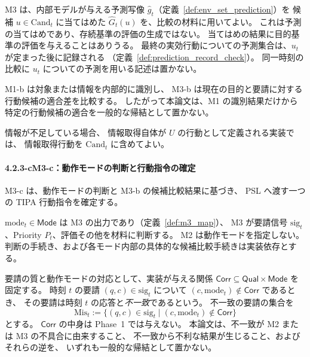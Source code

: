 \begin{remark}[候補ごとの予測の利用]
\label{rem:candidate_prediction}
M3 は、内部モデルが与える予測写像 $\hat g_t$（定義~\ref{def:env_set_prediction}）を
候補 $u\in\mathrm{Cand}_t$ に当てはめた $\hat G_t(u)$ を、比較の材料に用いてよい。
これは予測の当てはめであり、存続基準の評価の生成ではない。
当てはめの結果に目的基準の評価を与えることはありうる。
最終の実効行動についての予測集合は、$u_t$ が定まった後に記録される
（定義~\ref{def:prediction_record_check}）。
同一時刻の比較に $u_t$ についての予測を用いる記述は置かない。
\end{remark}


\begin{remark}[要請適合性と識別の区別]
\label{rem:fit_vs_identity}
M1-b は対象または情報を内部的に識別し、
M3-b は現在の目的と要請に対する行動候補の適合差を比較する。
したがって本論文は、M1 の識別結果だけから特定の行動候補の適合を一般的な帰結として置かない。
\end{remark}

情報が不足している場合、
情報取得自体が $U$ の行動として定義される実装では、
情報取得行動を $\mathrm{Cand}_t$ に含めてよい。

\paragraph*{4.2.3-c\quad M3-c：動作モードの判断と行動指令の確定}

M3-c は、動作モードの判断と M3-b の候補比較結果に基づき、
PSL へ渡す一つの TIPA 行動指令を確定する。

\begin{definition}
\label{def:mode_judgment}
$\mathrm{mode}_t\in\mathsf{Mode}$ は M3 の出力であり（定義~\ref{def:m3_map}）、
M3 が要請信号 $\mathrm{sig}_t$、Priority $P_t$、評価その他を材料に判断する。
M2 は動作モードを指定しない。
判断の手続き、および各モード内部の具体的な候補比較手続きは実装依存とする。
\end{definition}

\begin{definition}
\label{def:request_response_mismatch}
要請の質と動作モードの対応として、実装が与える関係
$\mathsf{Corr}\subseteq\mathsf{Qual}\times\mathsf{Mode}$ を固定する。
時刻 $t$ の要請 $(q,c)\in \mathrm{sig}_t$ について $(c,\mathrm{mode}_t)\notin\mathsf{Corr}$ であるとき、
その要請は時刻 $t$ の応答と\emph{不一致}であるという。
不一致の要請の集合を
\[
  \mathrm{Mis}_t:=\{(q,c)\in \mathrm{sig}_t\mid (c,\mathrm{mode}_t)\notin\mathsf{Corr}\}
\]
とする。
$\mathsf{Corr}$ の中身は Phase~1 では与えない。
本論文は、不一致が M2 または M3 の不具合に由来すること、
不一致から不利な結果が生じること、およびそれらの逆を、
いずれも一般的な帰結として置かない。
\end{definition}

